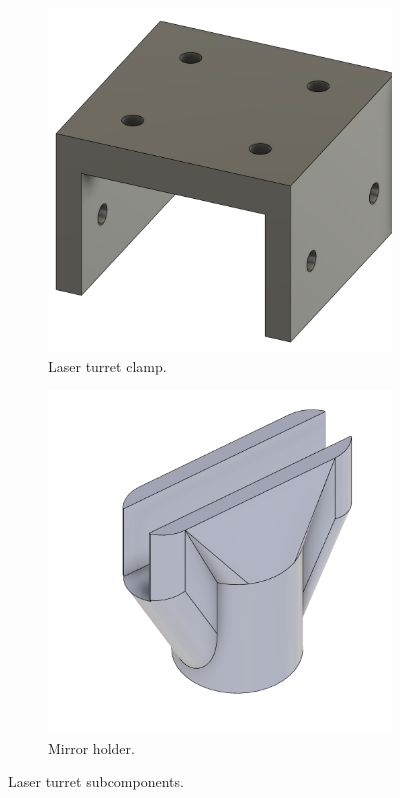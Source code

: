 \begin{figure}[!htb]
    \quad
    \begin{subfigure}{0.45\textwidth}
        \includegraphics[width=0.8\linewidth]{figures/hardware_design/turret_clamp.png}
        \caption{Laser turret clamp.}
    \end{subfigure}
    \quad
    \begin{subfigure}{0.45\textwidth}
        \includegraphics[width=0.8\linewidth]{figures/hardware_design/mirror_holder.png}
        \caption{Mirror holder.}
    \end{subfigure}
    \caption{Laser turret subcomponents.}
    \label{fig:turret_subcomponents}
\end{figure}



